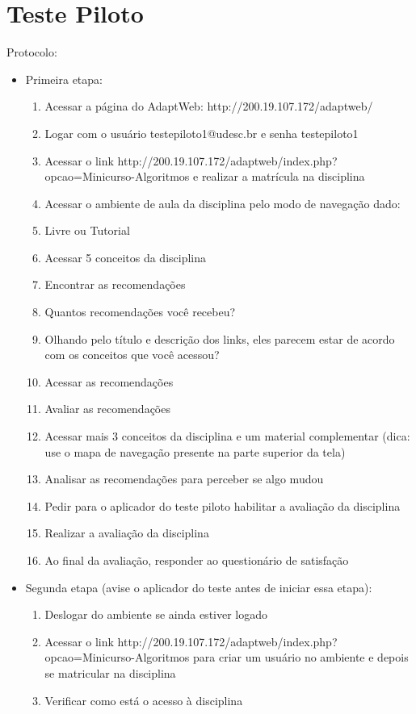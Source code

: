 \chapter{Teste Piloto}\label{ape:teste-piloto}

Protocolo:
\begin{itemize}
  \item Primeira etapa:
  \begin{enumerate}
  \item Acessar a página do AdaptWeb: http://200.19.107.172/adaptweb/
  \item Logar com o usuário testepiloto1@udesc.br e senha testepiloto1
  \item Acessar o link http://200.19.107.172/adaptweb/index.php?opcao=Minicurso-Algoritmos e realizar a matrícula na disciplina
  \item Acessar o ambiente de aula da disciplina pelo modo de navegação dado:
  \item Livre ou Tutorial
  \item Acessar 5 conceitos da disciplina
  \item Encontrar as recomendações
  \item Quantos recomendações você recebeu?
  \item Olhando pelo título e descrição dos links, eles parecem estar de acordo com os conceitos que você acessou?
  \item Acessar as recomendações
  \item Avaliar as recomendações
  \item Acessar mais 3 conceitos da disciplina e um material complementar (dica: use o mapa de navegação presente na parte superior da tela)
  \item Analisar as recomendações para perceber se algo mudou
  \item Pedir para o aplicador do teste piloto habilitar a avaliação da disciplina
  \item Realizar a avaliação da disciplina
  \item Ao final da avaliação, responder ao questionário de satisfação
  \end{enumerate}

  \item Segunda etapa (avise o aplicador do teste antes de iniciar essa etapa):
  \begin{enumerate}
  \item Deslogar do ambiente se ainda estiver logado
  \item Acessar o link http://200.19.107.172/adaptweb/index.php?opcao=Minicurso-Algoritmos para criar um usuário no ambiente e depois se matricular na disciplina
  \item Verificar como está o acesso à disciplina
  \end{enumerate}
\end{itemize}